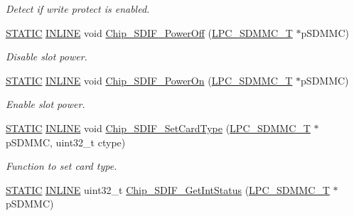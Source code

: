 \begin{DoxyCompactItemize}
\begin{DoxyCompactList}\small\item\em Detect if write protect is enabled. \end{DoxyCompactList}\item 
\hyperlink{group___l_p_c___types___public___macros_ga10b2d890d871e1489bb02b7e70d9bdfb}{S\+T\+A\+T\+IC} \hyperlink{spifi__18xx__43xx_8h_a2eb6f9e0395b47b8d5e3eeae4fe0c116}{I\+N\+L\+I\+NE} void \hyperlink{group___s_d_i_f__18_x_x__43_x_x_ga71ab66abadcab4bca2c034dd88bcf4aa}{Chip\+\_\+\+S\+D\+I\+F\+\_\+\+Power\+Off} (\hyperlink{struct_l_p_c___s_d_m_m_c___t}{L\+P\+C\+\_\+\+S\+D\+M\+M\+C\+\_\+T} $\ast$p\+S\+D\+M\+MC)
\begin{DoxyCompactList}\small\item\em Disable slot power. \end{DoxyCompactList}\item 
\hyperlink{group___l_p_c___types___public___macros_ga10b2d890d871e1489bb02b7e70d9bdfb}{S\+T\+A\+T\+IC} \hyperlink{spifi__18xx__43xx_8h_a2eb6f9e0395b47b8d5e3eeae4fe0c116}{I\+N\+L\+I\+NE} void \hyperlink{group___s_d_i_f__18_x_x__43_x_x_gac7838809730c5b4c05451c965e11bbd5}{Chip\+\_\+\+S\+D\+I\+F\+\_\+\+Power\+On} (\hyperlink{struct_l_p_c___s_d_m_m_c___t}{L\+P\+C\+\_\+\+S\+D\+M\+M\+C\+\_\+T} $\ast$p\+S\+D\+M\+MC)
\begin{DoxyCompactList}\small\item\em Enable slot power. \end{DoxyCompactList}\item 
\hyperlink{group___l_p_c___types___public___macros_ga10b2d890d871e1489bb02b7e70d9bdfb}{S\+T\+A\+T\+IC} \hyperlink{spifi__18xx__43xx_8h_a2eb6f9e0395b47b8d5e3eeae4fe0c116}{I\+N\+L\+I\+NE} void \hyperlink{group___s_d_i_f__18_x_x__43_x_x_ga57887b0b19cd2db90a106d5f159e2371}{Chip\+\_\+\+S\+D\+I\+F\+\_\+\+Set\+Card\+Type} (\hyperlink{struct_l_p_c___s_d_m_m_c___t}{L\+P\+C\+\_\+\+S\+D\+M\+M\+C\+\_\+T} $\ast$p\+S\+D\+M\+MC, uint32\+\_\+t ctype)
\begin{DoxyCompactList}\small\item\em Function to set card type. \end{DoxyCompactList}\item 
\hyperlink{group___l_p_c___types___public___macros_ga10b2d890d871e1489bb02b7e70d9bdfb}{S\+T\+A\+T\+IC} \hyperlink{spifi__18xx__43xx_8h_a2eb6f9e0395b47b8d5e3eeae4fe0c116}{I\+N\+L\+I\+NE} uint32\+\_\+t \hyperlink{group___s_d_i_f__18_x_x__43_x_x_gaed59d523e9405cb86836feaaf783801c}{Chip\+\_\+\+S\+D\+I\+F\+\_\+\+Get\+Int\+Status} (\hyperlink{struct_l_p_c___s_d_m_m_c___t}{L\+P\+C\+\_\+\+S\+D\+M\+M\+C\+\_\+T} $\ast$p\+S\+D\+M\+MC)

\end{DoxyCompactItemize}
